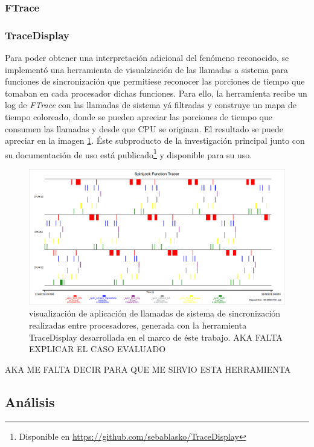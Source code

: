 \subsubsection{FTrace}
\subsubsection{TraceDisplay}
Para poder obtener una interpretación adicional del fenómeno reconocido, se implementó una herramienta de visualziación de las llamadas a sistema para funciones de sincronización que permitiese reconocer las porciones de tiempo que tomaban en cada procesador dichas funciones. Para ello, la herramienta recibe un log de \emph{FTrace} con las llamadas de sistema yá filtradas y construye un mapa de tiempo coloreado, donde se pueden apreciar las porciones de tiempo que consumen las llamadas y desde que CPU se originan. El resultado se puede apreciar en la imagen \ref{fig:traceDisplay}. Éste subproducto de la investigación principal junto con su documentación de uso está publicado\footnote{Disponible en \url{https://github.com/sebablasko/TraceDisplay}} y disponible para su uso.

\begin{figure}[!h]
	\centering
	\includegraphics[scale=0.35]{imagenes/traceVisualization.png}
	\caption{visualización de aplicación de llamadas de sistema de sincronización realizadas entre procesadores, generada con la herramienta TraceDisplay desarrollada en el marco de éste trabajo. AKA FALTA EXPLICAR EL CASO EVALUADO}
	\label{fig:traceDisplay}
\end{figure}

AKA ME FALTA DECIR PARA QUE ME SIRVIO ESTA HERRAMIENTA

\subsection{Análisis}

